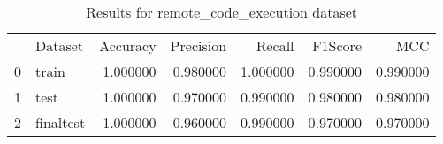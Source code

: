 \begin{table}
\caption{Results for remote_code_execution dataset}
\begin{tabular}{llrrrrr}
 & Dataset & Accuracy & Precision & Recall & F1Score & MCC \\
0 & train & 1.000000 & 0.980000 & 1.000000 & 0.990000 & 0.990000 \\
1 & test & 1.000000 & 0.970000 & 0.990000 & 0.980000 & 0.980000 \\
2 & finaltest & 1.000000 & 0.960000 & 0.990000 & 0.970000 & 0.970000 \\
\end{tabular}
\end{table}
